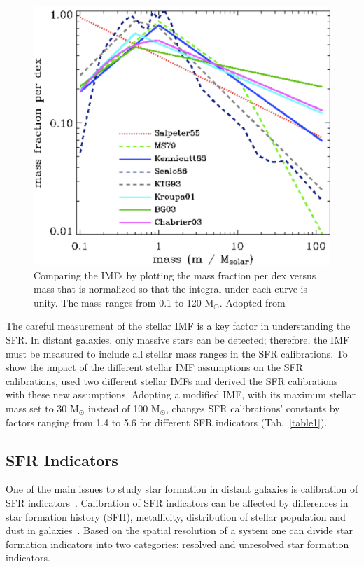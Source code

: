 \begin{figure}
\label{fig: imf}
\centering
\includegraphics[width=16cm]{../image_intro/imf}
\small
\caption{Comparing the IMFs by plotting the mass fraction per dex versus mass that is normalized so that the integral under each curve is unity. The mass ranges from 0.1 to 120 M$_\odot$. Adopted from~\cite{Baldry03}}
\end{figure}


The careful measurement of the stellar IMF is a key factor in understanding the SFR. 
In distant galaxies, only massive stars can be detected; therefore, the IMF must be measured to include all stellar mass ranges in the SFR calibrations. 
To show the impact of the different stellar IMF assumptions on the SFR calibrations, \cite{Calzetti13} used two different stellar IMFs and derived the SFR calibrations with these new assumptions.
Adopting a modified \cite{Kroupa01} IMF, with its maximum stellar mass set to 30 M$_{\odot}$ instead of 100 M$_{\odot}$, changes SFR calibrations' constants by factors ranging from 1.4 to 5.6 for different SFR indicators (Tab.~\ref{table1}). 

\subsection{SFR Indicators}

One of the main issues to study star formation in distant galaxies is calibration of SFR indicators~\citep[e.g.,][]{Lee10}. 
Calibration of SFR indicators can be affected by differences in star formation history (SFH), metallicity, distribution of stellar population and dust in galaxies~\citep{Calzetti13}. 
Based on the spatial resolution of a system one can divide star formation indicators into two categories: resolved and unresolved star formation indicators.

